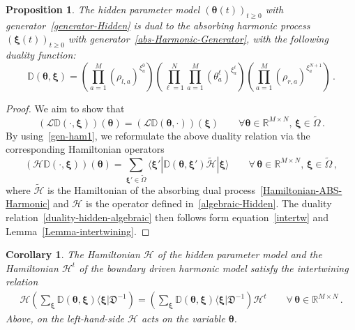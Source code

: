 \documentclass[11pt]{article}
\numberwithin{equation}{section}
\newtheorem{proposition}[theorem]{Proposition}
\newtheorem{corollary}[theorem]{Corollary}
\newcommand{\M}{M}
\newcommand{\N}{N}
\newcommand{\hmH}{\mathcal{H}}
\newcommand{\eH}{\mathcal{H}}
\newcommand{\ecH}{\bm{\mathscr{H}}}
\newcommand{\eL}{\mathcal{L}}
\newcommand{\ecL}{\bm{\mathscr{L}}}
\newcommand{\hidden}{\theta}
\begin{document}
\begin{proposition}\label{Proposition_Hidden-ABS}
The hidden parameter model $(\bm{\hidden}(t))_{t\geq 0}$ with generator~\eqref{generator-Hidden} is dual to the absorbing harmonic process $(\bm{\xi}(t))_{t\geq 0}$ with generator~\eqref{abs-Harmonic-Generator}, with the following duality function:
\begin{equation}\label{duality-function-hidden}
	\mathbb{D}(\bm{\hidden},\bm{\xi})=\left(\prod_{a=1}^{\M}(\rho_{l,a})^{\xi_{a}^{0}}\right)\left(\prod_{\ell=1}^{\N}\prod_{a=1}^{\M}(\hidden_{a}^{\ell})^{\xi_{a}^{\ell}}\right)\left(\prod_{a=1}^{\M}(\rho_{r,a})^{\xi_{a}^{\N+1}}\right)\,.
\end{equation}
 \end{proposition}
\begin{proof} 
We aim to show that 
\begin{equation}
   \left( \ecL \mathbb{D}(\cdot,\bm{\xi})\right)(\bm{\hidden})=\left(\eL\mathbb{D}(\bm{\hidden},\cdot)\right)(\bm{\xi})\qquad \forall \bm{\hidden}\in\mathbb{R}^{\M\times \N},\,\bm{\xi}\in \widetilde{\Omega}\,.
   \end{equation}
By using~\eqref{gen-ham1}, we reformulate the above duality relation via the corresponding Hamiltonian operators
\begin{equation}\label{duality-hidden-algebraic}
    \left( \ecH\mathbb{D}(\cdot,\bm{\xi})\right)(\bm{\hidden})=\sum_{\bm{\xi}'\in \widetilde{\Omega}}\langle \bm{\xi}'|\mathbb{D}(\bm{\hidden},\bm{\xi}')\widetilde{\eH}|\bm{\xi}\rangle\qquad \forall\,\bm{\hidden}\in \mathbb{R}^{\M\times \N},\,\bm{\xi}\in \widetilde{\Omega}\,,
\end{equation}
where $\widetilde{\eH}$ is the Hamiltonian of the absorbing dual process~\eqref{Hamiltonian-ABS-Harmonic} and $\ecH$ is the operator defined in~\eqref{algebraic-Hidden}. 
The duality relation~\eqref{duality-hidden-algebraic} then follows form equation~\eqref{intertw} and Lemma~\ref{Lemma-intertwining}.


                    
\end{proof}
  \begin{corollary}
  The Hamiltonian $\ecH$ of the hidden parameter model and the Hamiltonian $\eH^{t}$ of the boundary driven harmonic model satisfy the intertwining relation
	\begin{equation}
			\begin{split}
				\hmH \left(\sum_{\bm{\xi}} \mathbb{D}(\bm{\hidden},\bm{\xi})\langle \bm{\xi}|\mathfrak{D}^{-1}\right) =\left(\sum_{\bm{\xi}} \mathbb{D}(\bm{\hidden},\bm{\xi})\langle \bm{\xi}|\mathfrak{D}^{-1}\right) \eH^t\qquad \forall\, \bm{\hidden}\in \mathbb{R}^{\M\times \N}\,.
			\end{split}
		\end{equation}
        Above, on the left-hand-side $\ecH$ acts on the variable $\bm{\hidden}$. 
\end{corollary}
\end{document}
